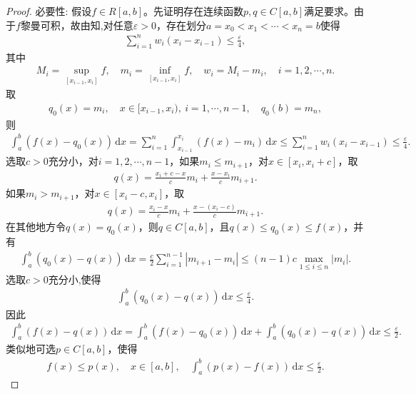\documentclass[../../main.tex]{subfiles}%
\begin{document}
\begin{proof}
{\heiti 必要性:} 假设$f\in R[a,b]$。先证明存在连续函数$p,q\in C[a,b]$满足要求。由于$f$黎曼可积，故由知,对任意$\varepsilon>0$，存在划分$a=x_0<x_1<\cdots<x_n=b$使得
\begin{align}
\sum\limits_{i=1}^{n} w_i (x_i-x_{i-1}) \leqslant \frac{\varepsilon}{4}, \label{thm49:proof:part}
\end{align}
其中
\begin{align*}
M_i=\sup_{[x_{i-1},x_i]} f,\quad m_i=\inf_{[x_{i-1},x_i]} f,\quad w_i=M_i-m_i,\quad i=1,2,\cdots,n.
\end{align*}
取
\begin{align*}
q_0(x)=m_i,\quad x\in[x_{i-1},x_i),\ i=1,\cdots,n-1,\quad q_0(b)=m_n,
\end{align*}
则
\begin{align}
\int_{a}^{b} (f(x)-q_0(x))\,\mathrm{d}x = \sum\limits_{i=1}^{n} \int_{x_{i-1}}^{x_i} (f(x)-m_i)\,\mathrm{d}x \leqslant \sum\limits_{i=1}^{n} w_i (x_i-x_{i-1}) \leqslant \frac{\varepsilon}{4}. \label{thm49:proof:q0}
\end{align}
选取$c>0$充分小，对$i=1,2,\cdots,n-1$，如果$m_i\leqslant m_{i+1}$，对$x\in[x_i,x_i+c]$，取
\begin{align*}
q(x)=\frac{x_i+c-x}{c}m_i + \frac{x-x_i}{c} m_{i+1}.
\end{align*}
如果$m_i>m_{i+1}$，对$x\in[x_i-c,x_i]$，取
\begin{align*}
q(x)=\frac{x_i-x}{c}m_i + \frac{x-(x_i-c)}{c} m_{i+1}.
\end{align*}
在其他地方令$q(x)=q_0(x)$，则$q\in C[a,b]$，且$q(x)\leqslant q_0(x)\leqslant f(x)$，并有
\begin{align*}
\int_{a}^{b} (q_0(x)-q(x))\,\mathrm{d}x = \frac{c}{2} \sum\limits_{i=1}^{n-1} |m_{i+1}-m_i| \leqslant (n-1)c \max_{1\leqslant i\leqslant n} |m_i|. 
\end{align*}
选取$c>0$充分小,使得
\begin{align*}
\int_{a}^{b} (q_0(x)-q(x))\,\mathrm{d}x \leqslant \frac{\varepsilon}{4}. 
\end{align*}
因此
\begin{align}
\int_{a}^{b} (f(x)-q(x))\,\mathrm{d}x = \int_{a}^{b} (f(x)-q_0(x))\,\mathrm{d}x + \int_{a}^{b} (q_0(x)-q(x))\,\mathrm{d}x \leqslant \frac{\varepsilon}{2}. \label{thm49:proof:fq}
\end{align}
类似地可选$p\in C[a,b]$，使得
\begin{align}
f(x)\leqslant p(x),\quad x\in[a,b],\quad \int_{a}^{b} (p(x)-f(x))\,\mathrm{d}x \leqslant \frac{\varepsilon}{2}. \label{thm49:proof:fp}

\end{align}
\end{proof}
\end{document}
